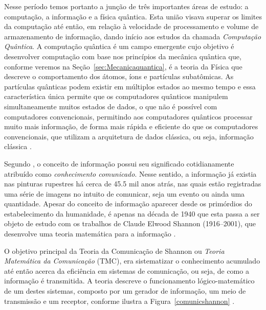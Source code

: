 Nesse período temos portanto a junção de três importantes áreas de estudo: a computação, a informação e a física quântica. Esta união visava superar os limites da computação até então, em relação à velocidade de processamento e volume de armazenamento de informação, dando início aos estudos da chamada \textit{Computação Quântica}. A computação quântica é um campo emergente cujo objetivo é desenvolver computação com base nos princípios da mecânica quântica que, conforme veremos na Seção~\ref{sec:Mecanicaquantica}, é a teoria da Física que descreve o comportamento dos átomos, íons e partículas subatômicas. As partículas quânticas podem existir em múltiplos estados ao mesmo tempo e essa característica única permite que os computadores quânticos manipulem simultaneamente muitos estados de dados, o que não é possível com computadores convencionais, permitindo aos computadores quânticos processar muito mais informação, de forma mais rápida e eficiente do que os computadores convencionais, que utilizam a arquitetura de dados clássica, ou seja, informação clássica \cite{CompInfoQuantica}.

Segundo \textcite{conceitoinformação}, o conceito de informação possui seu significado cotidianamente atribuído como \textit{conhecimento comunicado}. Nesse sentido, a informação já existia nas pinturas rupestres há cerca de \num{45.5} mil anos atrás, nas quais estão registradas uma série de imagens no intuito de comunicar, seja um evento ou ainda uma quantidade. Apesar do conceito de informação aparecer desde os primórdios do estabelecimento da humanidade, é apenas na década de 1940 que esta passa a ser objeto de estudo com os trabalhos de Claude Elwood Shannon (1916--2001), que desenvolve uma teoria matemática para a informação \cite{CiênciaTransiçãoSeculosa}.

O objetivo principal da Teoria da Comunicação de Shannon ou \textit{Teoria Matemática da Comunicação} (TMC), era sistematizar o conhecimento acumulado até então acerca da eficiência em sistemas de comunicação, ou seja, de como a informação é transmitida. A teoria descreve o funcionamento lógico-matemático de um destes sistemas, composto por um gerador de informação, um meio de transmissão e um receptor, conforme ilustra a Figura~\ref{comunicshannon} \cite{MTC}.

